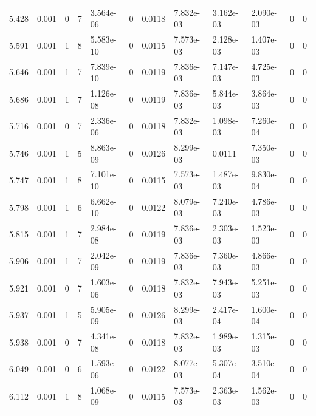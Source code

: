\documentclass[preview]{standalone}
\begin{document}
{{{{\begin{tabular}{L{1.2cm}C{1.2cm} C{0.3cm}C{0.5cm} C{1.4cm}C{1.4cm} C{1.4cm}C{1.4cm} C{1.6cm}C{1.6cm} C{1.6cm}C{1.6cm}}
  5.428  &  0.001  & 0     &  7 &  3.564e-06  & 0  &  0.0118&   7.832e-03& 3.162e-03 & 2.090e-03   &  0 & 0  \\ 
  5.591  &  0.001  & 1     &  8 &  5.583e-10  & 0  &  0.0115&   7.573e-03& 2.128e-03 & 1.407e-03   &  0 & 0  \\ 
  5.646  &  0.001  & 1     &  7 &  7.839e-10  & 0  &  0.0119&   7.836e-03& 7.147e-03 & 4.725e-03   &  0 & 0  \\ 
  5.686  &  0.001  & 1     &  7 &  1.126e-08  & 0  &  0.0119&   7.836e-03& 5.844e-03 & 3.864e-03   &  0 & 0  \\ 
  5.716  &  0.001  & 0     &  7 &  2.336e-06  & 0  &  0.0118&   7.832e-03& 1.098e-03 & 7.260e-04   &  0 & 0  \\ 
  5.746  &  0.001  & 1     &  5 &  8.863e-09  & 0  &  0.0126&   8.299e-03& 0.0111 & 7.350e-03   &  0 & 0  \\ 
  5.747  &  0.001  & 1     &  8 &  7.101e-10  & 0  &  0.0115&   7.573e-03& 1.487e-03 & 9.830e-04   &  0 & 0  \\ 
  5.798  &  0.001  & 1     &  6 &  6.662e-10  & 0  &  0.0122&   8.079e-03& 7.240e-03 & 4.786e-03   &  0 & 0  \\ 
  5.815  &  0.001  & 1     &  7 &  2.984e-08  & 0  &  0.0119&   7.836e-03& 2.303e-03 & 1.523e-03   &  0 & 0  \\ 
  5.906  &  0.001  & 1     &  7 &  2.042e-09  & 0  &  0.0119&   7.836e-03& 7.360e-03 & 4.866e-03   &  0 & 0  \\ 
  5.921  &  0.001  & 0     &  7 &  1.603e-06  & 0  &  0.0118&   7.832e-03& 7.943e-03 & 5.251e-03   &  0 & 0  \\ 
  5.937  &  0.001  & 1     &  5 &  5.905e-09  & 0  &  0.0126&   8.299e-03& 2.417e-04 & 1.600e-04   &  0 & 0  \\ 
  5.938  &  0.001  & 0     &  7 &  4.341e-08  & 0  &  0.0118&   7.832e-03& 1.989e-03 & 1.315e-03   &  0 & 0  \\ 
  6.049  &  0.001  & 0     &  6 &  1.593e-06  & 0  &  0.0122&   8.077e-03& 5.307e-04 & 3.510e-04   &  0 & 0  \\ 
  6.112  &  0.001  & 1     &  8 &  1.068e-09  & 0  &  0.0115&   7.573e-03& 2.363e-03 & 1.562e-03   &  0 & 0  \\ 
\hline 
\end{tabular} 

}}}}
\end{document}
